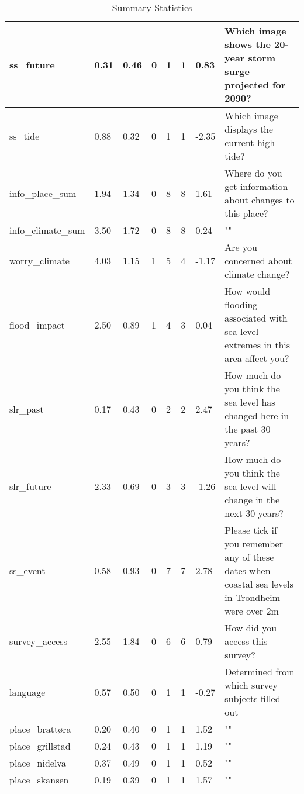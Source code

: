 \begin{center}
\begin{table}[!ht]
\begin{tabular}{|l|l|l|l|l|l|l|l|}
        ss\_future & 0.31 & 0.46 & 0 & 1 & 1 & 0.83 & Which image shows the 20-year storm surge projected for 2090? \\ \hline
        ss\_tide & 0.88 & 0.32 & 0 & 1 & 1 & -2.35 & Which image displays the current high tide? \\ \hline
        info\_place\_sum & 1.94 & 1.34 & 0 & 8 & 8 & 1.61 & Where do you get information about changes to this place? \\ \hline
        info\_climate\_sum & 3.50 & 1.72 & 0 & 8 & 8 & 0.24 & "" \\ \hline
        worry\_climate & 4.03 & 1.15 & 1 & 5 & 4 & -1.17 & Are you concerned about climate change? \\ \hline
        flood\_impact & 2.50 & 0.89 & 1 & 4 & 3 & 0.04 & How would flooding associated with sea level extremes in this area affect you? \\ \hline
        slr\_past & 0.17 & 0.43 & 0 & 2 & 2 & 2.47 & How much do you think the sea level has changed here in the past 30 years? \\ \hline
        slr\_future & 2.33 & 0.69 & 0 & 3 & 3 & -1.26 & How much do you think the sea level will change in the next 30 years? \\ \hline
        ss\_event & 0.58 & 0.93 & 0 & 7 & 7 & 2.78 & Please tick if you remember any of these dates when coastal sea levels in Trondheim were over 2m \\ \hline
        survey\_access & 2.55 & 1.84 & 0 & 6 & 6 & 0.79 & How did you access this survey? \\ \hline
        language & 0.57 & 0.50 & 0 & 1 & 1 & -0.27 & Determined from which survey subjects filled out \\ \hline
        place\_brattøra & 0.20 & 0.40 & 0 & 1 & 1 & 1.52 & "" \\ \hline
        place\_grillstad & 0.24 & 0.43 & 0 & 1 & 1 & 1.19 & "" \\ \hline
        place\_nidelva & 0.37 & 0.49 & 0 & 1 & 1 & 0.52 & "" \\ \hline
        place\_skansen & 0.19 & 0.39 & 0 & 1 & 1 & 1.57 & "" \\ \hline
    \end{tabular}
    \caption{Summary Statistics}
\label{table:summary_stats}
\end{table}
\end{center}

